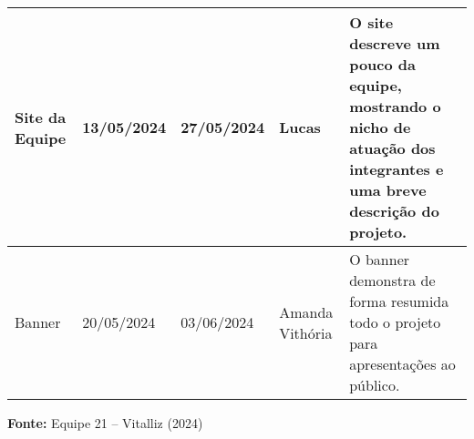 \begin{center}
\begin{adjustbox}{max width=\textwidth}
\begin{tabular}{|m{4cm}|m{2.5cm}|m{2.5cm}|m{3cm}|m{8cm}|}
Site da Equipe & 13/05/2024 & 27/05/2024 & Lucas &
O site descreve um pouco da equipe, mostrando o nicho de atuação dos integrantes e uma breve descrição do projeto. \\ \hline

Banner & 20/05/2024 & 03/06/2024 & Amanda Vithória &
O banner demonstra de forma resumida todo o projeto para apresentações ao público. \\ \hline

\end{tabular}
\end{adjustbox}

\vspace{0.3em}
\small{\textbf{Fonte:} Equipe 21 – Vitalliz (2024)}

\end{center}

